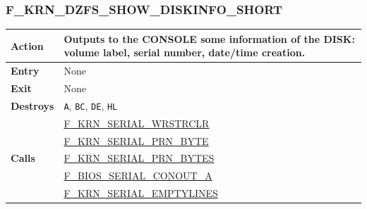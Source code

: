 \documentclass[a4paper,11pt]{article}
\begin{document}
        \subsubsection{F\_KRN\_DZFS\_SHOW\_DISKINFO\_SHORT}
        \label{func:fkrndzfsshowdiskinfoshort}
        \begin{tabular}{l p{9cm}}
            \hline\textbf{Action}
            & Outputs to the \textbf{CONSOLE} some information of the 
            \textbf{DISK}: volume label, serial number, date/time creation.\\
            \hline\textbf{Entry} & None\\
            \hline\textbf{Exit} & None\\
            \hline\textbf{Destroys} & \texttt{A}, \texttt{BC}, \texttt{DE}, 
            \texttt{HL}\\
            \hline\multirow[t]{5}{4em}{\textbf{Calls}}
            & \hyperref[func:fkrnserialwrstrclr]{F\_KRN\_SERIAL\_WRSTRCLR}\\
            & \hyperref[func:fkrnserialprnbyte]{F\_KRN\_SERIAL\_PRN\_BYTE}\\
            & \hyperref[func:fkrnserialprnbytes]{F\_KRN\_SERIAL\_PRN\_BYTES}\\
            & \hyperref[func:fbiosserialconouta]{F\_BIOS\_SERIAL\_CONOUT\_A}\\
            & \hyperref[func:fkrnserialemptylines]{F\_KRN\_SERIAL\_EMPTYLINES}\\
            \hline
        \end{tabular}

\end{document}
